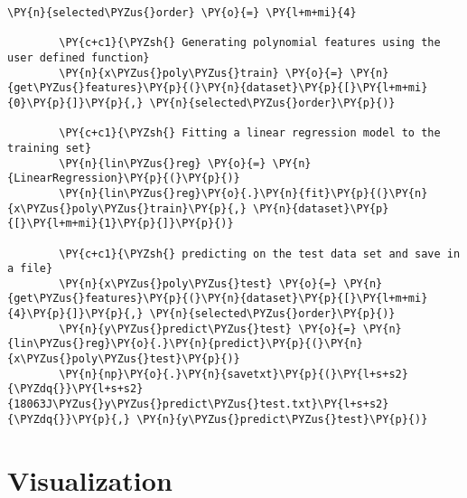 \documentclass[a4paper,11pt]{article}%
\begin{document}
\begin{tcolorbox}[breakable, size=fbox, boxrule=1pt, pad at break*=1mm,colback=cellbackground, colframe=cellborder]
	\begin{Verbatim}[commandchars=\\\{\}]
		\PY{n}{selected\PYZus{}order} \PY{o}{=} \PY{l+m+mi}{4}
		
		\PY{c+c1}{\PYZsh{} Generating polynomial features using the user defined function}
		\PY{n}{x\PYZus{}poly\PYZus{}train} \PY{o}{=} \PY{n}{get\PYZus{}features}\PY{p}{(}\PY{n}{dataset}\PY{p}{[}\PY{l+m+mi}{0}\PY{p}{]}\PY{p}{,} \PY{n}{selected\PYZus{}order}\PY{p}{)}
		
		\PY{c+c1}{\PYZsh{} Fitting a linear regression model to the training set}
		\PY{n}{lin\PYZus{}reg} \PY{o}{=} \PY{n}{LinearRegression}\PY{p}{(}\PY{p}{)}
		\PY{n}{lin\PYZus{}reg}\PY{o}{.}\PY{n}{fit}\PY{p}{(}\PY{n}{x\PYZus{}poly\PYZus{}train}\PY{p}{,} \PY{n}{dataset}\PY{p}{[}\PY{l+m+mi}{1}\PY{p}{]}\PY{p}{)}
		
		\PY{c+c1}{\PYZsh{} predicting on the test data set and save in a file}
		\PY{n}{x\PYZus{}poly\PYZus{}test} \PY{o}{=} \PY{n}{get\PYZus{}features}\PY{p}{(}\PY{n}{dataset}\PY{p}{[}\PY{l+m+mi}{4}\PY{p}{]}\PY{p}{,} \PY{n}{selected\PYZus{}order}\PY{p}{)}
		\PY{n}{y\PYZus{}predict\PYZus{}test} \PY{o}{=} \PY{n}{lin\PYZus{}reg}\PY{o}{.}\PY{n}{predict}\PY{p}{(}\PY{n}{x\PYZus{}poly\PYZus{}test}\PY{p}{)}
		\PY{n}{np}\PY{o}{.}\PY{n}{savetxt}\PY{p}{(}\PY{l+s+s2}{\PYZdq{}}\PY{l+s+s2}{18063J\PYZus{}y\PYZus{}predict\PYZus{}test.txt}\PY{l+s+s2}{\PYZdq{}}\PY{p}{,} \PY{n}{y\PYZus{}predict\PYZus{}test}\PY{p}{)}
	\end{Verbatim}
\end{tcolorbox}

\hypertarget{visualization}{%
	\section{Visualization}\label{visualization}}
\end{document}
